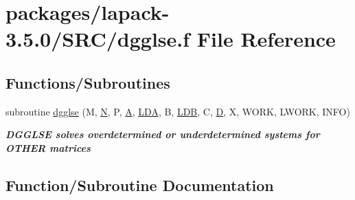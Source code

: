 \hypertarget{dgglse_8f}{}\section{packages/lapack-\/3.5.0/\+S\+R\+C/dgglse.f File Reference}
\label{dgglse_8f}
\subsection*{Functions/\+Subroutines}
\begin{DoxyCompactItemize}
\item 
subroutine \hyperlink{dgglse_8f_a1f03c8580ac1aaafb0f092fad4377d16}{dgglse} (M, \hyperlink{polmisc_8c_a0240ac851181b84ac374872dc5434ee4}{N}, P, \hyperlink{classA}{A}, \hyperlink{example__user_8c_ae946da542ce0db94dced19b2ecefd1aa}{L\+D\+A}, B, \hyperlink{example__user_8c_a50e90a7104df172b5a89a06c47fcca04}{L\+D\+B}, C, \hyperlink{odrpack_8h_a7dae6ea403d00f3687f24a874e67d139}{D}, X, W\+O\+R\+K, L\+W\+O\+R\+K, I\+N\+F\+O)
\begin{DoxyCompactList}\small\item\em {\bfseries  D\+G\+G\+L\+S\+E solves overdetermined or underdetermined systems for O\+T\+H\+E\+R matrices} \end{DoxyCompactList}\end{DoxyCompactItemize}


\subsection{Function/\+Subroutine Documentation}
\hypertarget{dgglse_8f_a1f03c8580ac1aaafb0f092fad4377d16}{}
